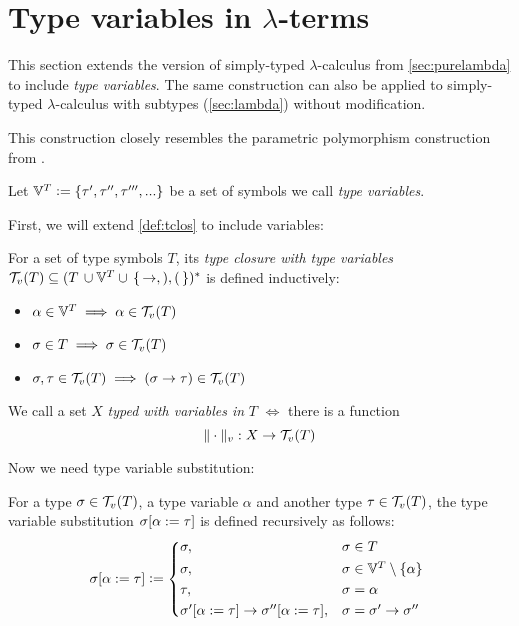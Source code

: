 \documentclass[main.tex]{subfiles}
\begin{document}
\section{Type variables in $\lambda$-terms}
\label{lambda:typevars}

This section extends the version of simply-typed $\lambda$-calculus from
\cref{sec:purelambda} to include \emph{type variables}. The same construction
can also be applied to simply-typed $\lambda$-calculus with subtypes
(\cref{sec:lambda}) without modification.

This construction closely resembles the parametric polymorphism construction
from \cite[chap.~25]{pierce}.

Let $\mathbb{V}^{T} \vcentcolon= \{ \tau', \tau'', \tau''', ... \}$ be a set of symbols we
call \emph{type variables}.

First, we will extend \cref{def:tclos} to include variables:
\begin{defn}
    For a set of type symbols $T$, its \emph{type closure with type variables}
    $\mathcal{T}_v( T ) \subseteq (T \, \cup \mathbb{V}^{T} \cup \,\{\, \rightarrow, ), ( \,\})^*$ is defined
    inductively:

    \begin{itemize}
        \item $\alpha \in \mathbb{V}^{T} \implies \alpha \in \mathcal{T}_v( T )$
        \item $\sigma \in T \implies \sigma \in \mathcal{T}_v( T )$
        \item $\sigma, \tau \in \mathcal{T}_v( T ) \implies (\sigma \rightarrow \tau) \in \mathcal{T}_v( T )$
    \end{itemize}
\end{defn}

\begin{defn}
    We call a set $X$ \emph{typed with variables in} $T$ $\iff$ there is a function
    \[ \|\cdot\|_v : X \rightarrow \mathcal{T}_v( T ) \]
\end{defn}

Now we need type variable substitution:
\begin{defn}
    For a type $\sigma \in \mathcal{T}_v( T )$, a type variable $\alpha$ and another
    type $\tau \in \mathcal{T}_v( T )$, the type variable substitution
    $\sigma [ \alpha := \tau ]$ is defined recursively as follows:
    \[
        \subst{\sigma}{\alpha}{\tau} \defeq
        \begin{cases*}
            \sigma ,& $\sigma \in T$ \\
            \sigma ,& $\sigma \in \tvars \setminus \{ \alpha \}$ \\
            \tau ,& $\sigma = \alpha$ \\
            \subst{\sigma'}{\alpha}{\tau} \tot \subst{\sigma''}{\alpha}{\tau}
 ,& $\sigma = \sigma' \tot \sigma''$ \\
        \end{cases*}
    \]
\end{defn}
\end{document}
